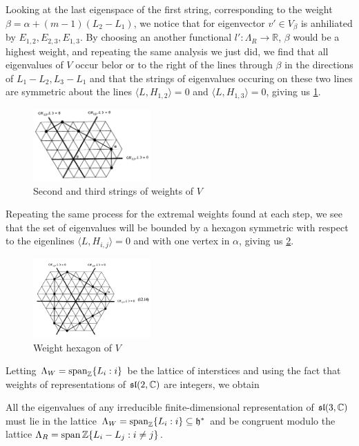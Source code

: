 \documentclass{report}
\begin{document}
Looking at the last eigenspace of the first string, corresponding to the weight $\beta = \alpha + (m-1)(L_2 - L_1)$, we notice that for eigenvector $v' \in V_\beta$ is anhiliated by $E_{1,2}, E_{2,3}, E_{1,3}$.
By choosing an another functional $l':\Lambda_R \to \mathbb R$, $\beta$ would be a highest weight, and repeating the same analysis we just did, we find that all eigenvalues of $V$ occur belor or to the right of the lines through $\beta$ in the directions of $L_1 - L_2, L_3 - L_1$ and that the strings of eigenvalues occuring on these two lines are symmetric about the lines $\langle L, H_{1,2} \rangle = 0$ and $\langle L, H_{1,3} \rangle = 0$, giving us \cref{fig:sl_3_C_string_of_weights_2}.
\begin{figure}[h]
    \centering
    \includegraphics[width=0.4\textwidth]{sl_3_C_string_of_weights_2.png}
    \caption{Second and third strings of weights of $V$}
    \label{fig:sl_3_C_string_of_weights_2}
\end{figure}
Repeating the same process for the extremal weights found at each step, we see that the set of eigenvalues will be bounded by a hexagon symmetric with respect to the eigenlines $\langle L, H_{i,j} \rangle = 0$ and with one vertex in $\alpha$, giving us \cref{fig:sl_3_C_weight_hexagon}.
\begin{figure}[h]
    \centering
    \includegraphics[width=0.4\textwidth]{sl_3_C_weight_hexagon.png}
    \caption{Weight hexagon of $V$}
    \label{fig:sl_3_C_weight_hexagon}
\end{figure}

Letting $\Lambda_W = \operatorname{span}_{\mathbb Z} \{L_i : i\}$ be the lattice of interstices and using the fact that weights of representations of $\operatorname{{\mathfrak{sl}}}(2, \mathbb C)$ are integers, we obtain
\begin{proposition}
    All the eigenvalues of any irreducible finite-dimensional representation of $\operatorname{{\mathfrak{sl}}}(3, \mathbb C)$ must lie in the lattice $\Lambda_W = \operatorname{span}_{\mathbb Z} \{L_i : i\} \subseteq \mathfrak h^*$ and be congruent modulo the lattice $\Lambda_R = \operatorname{span}{\mathbb Z} \{L_i - L_j : i \neq j\}$.
\end{proposition}
\end{document}
